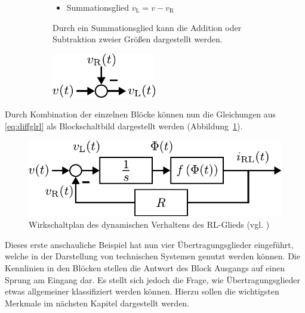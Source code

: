 \begin{figure}[h]
\begin{subfigure}[c]{\textwidth}
\end{subfigure} 
%
%
  \begin{subfigure}[c]{\textwidth}
	\begin{minipage}{0.5\textwidth}
		\begin{itemize}
			\item Summationsglied $v_{\text{L}}=v-v_{\text{R}}$
		\end{itemize}
		Durch ein Summationsglied kann die Addition oder Subtraktion zweier Größen dargestellt werden.
	\end{minipage}\hfill
	\begin{minipage}{0.5\textwidth}
		\centering
		\includegraphics[width=0.5\textwidth]{Abbildungen/Modellbildung/PDF/Summationsglied.pdf}
	\end{minipage}
\end{subfigure}
\end{figure}
%
%
Durch Kombination der einzelnen Blöcke können nun die Gleichungen aus \eqref{eq:diffglrl} als Blockschaltbild dargestellt werden (Abbildung~\ref{fig:blockschaltbild}).
%
\begin{figure}[h]
	\centering
	\includegraphics[width=0.65\linewidth]{Abbildungen/Modellbildung/PDF/Wirkschaltplan.pdf}
	\caption{Wirkschaltplan des dynamischen Verhaltens des RL-Glieds (vgl. \cite{Foellinger94})}
	\label{fig:blockschaltbild}
\end{figure}
%
Dieses erste anschauliche Beispiel hat nun vier Übertragungsglieder eingeführt, welche in der Darstellung von technischen Systemen genutzt werden können. Die Kennlinien in den Blöcken stellen die Antwort des Block Ausgangs auf einen Sprung am Eingang dar. Es stellt sich jedoch die Frage, wie Übertragungsglieder etwas allgemeiner klassifiziert werden können. Hierzu sollen die wichtigsten Merkmale im nächsten Kapitel dargestellt werden.
%
